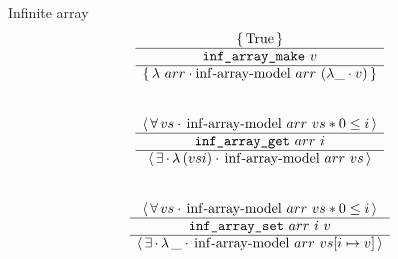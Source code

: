 \begin{frame}{Infinite array}
\[
	\begin{array}{c}
			\triplePretty{
				\iTrue
			}{
				\texttt{inf\_array\_make}\ v
			}{
				\lambda\ arr \cdot \mathrm{inf \mathhyphen array \mathhyphen model}\ arr\ (\lambda \_ \cdot v)
			}
		\\\\\\
			\atriplePretty{
				vs
			}{
				\mathrm{inf \mathhyphen array \mathhyphen model}\ arr\ vs \iSep
				0 \leq i
			}{
				\texttt{inf\_array\_get}\ arr\ i
			}{
			}{
				(vs i)
			}{
				\mathrm{inf \mathhyphen array \mathhyphen model}\ arr\ vs
			}
		\\\\\\
			\atriplePretty{
				vs
			}{
				\mathrm{inf \mathhyphen array \mathhyphen model}\ arr\ vs \iSep
				0 \leq i
			}{
				\texttt{inf\_array\_set}\ arr\ i\ v
			}{
			}{
				\_
			}{
				\mathrm{inf \mathhyphen array \mathhyphen model}\ arr\ vs [i \mapsto v]
			}
	\end{array}
\]
\end{frame}